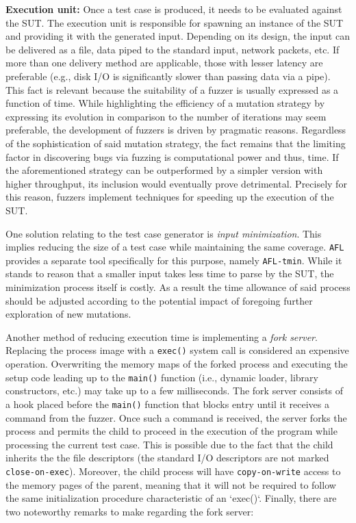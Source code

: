 \textbf{Execution unit:} Once a test case is produced, it needs to be evaluated against the SUT. The execution unit is responsible for spawning an instance of the SUT and providing it with the generated input. Depending on its design, the input can be delivered as a file, data piped to the standard input, network packets, etc. If more than one delivery method are applicable, those with lesser latency are preferable (e.g., disk I/O is significantly slower than passing data via a pipe). This fact is relevant because the suitability of a fuzzer is usually expressed as a function of time. While highlighting the efficiency of a mutation strategy by expressing its evolution in comparison to the number of iterations may seem preferable, the development of fuzzers is driven by pragmatic reasons. Regardless of the sophistication of said mutation strategy, the fact remains that the limiting factor in discovering bugs via fuzzing is computational power and thus, time. If the aforementioned strategy can be outperformed by a simpler version with higher throughput, its inclusion would eventually prove detrimental. Precisely for this reason, fuzzers implement techniques for speeding up the execution of the SUT.

One solution relating to the test case generator is \textit{input minimization}. This implies reducing the size of a test case while maintaining the same coverage. \texttt{AFL} provides a separate tool specifically for this purpose, namely \texttt{\texttt{AFL}-tmin}. While it stands to reason that a smaller input takes less time to parse by the SUT, the minimization process itself is costly. As a result the time allowance of said process should be adjusted according to the potential impact of foregoing further exploration of new mutations.

Another method of reducing execution time is implementing a \textit{fork server}. Replacing the process image with a \texttt{exec()} system call is considered an expensive operation. Overwriting the memory maps of the forked process and executing the setup code leading up to the \texttt{main()} function (i.e., dynamic loader, library constructors, etc.) may take up to a few milliseconds. The fork server consists of a hook placed before the \texttt{main()} function that blocks entry until it receives a command from the fuzzer. Once such a command is received, the server forks the process and permits the child to proceed in the execution of the program while processing the current test case. This is possible due to the fact that the child inherits the the file descriptors (the standard I/O descriptors are not marked \texttt{close-on-exec}). Moreover, the child process will have \texttt{copy-on-write} access to the memory pages of the parent, meaning that it will not be required to follow the same initialization procedure characteristic of an `exec()`. Finally, there are two noteworthy remarks to make regarding the fork server:

